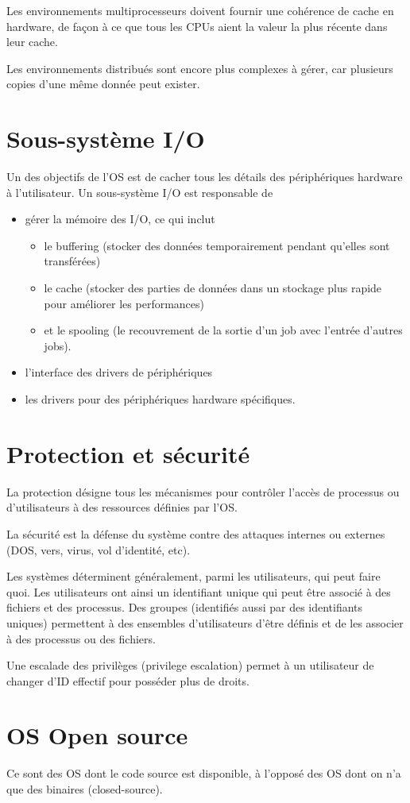 
Les environnements multiprocesseurs doivent fournir une cohérence de cache en hardware, de façon à ce que tous les CPUs aient la valeur la plus récente dans leur cache.

Les environnements distribués sont encore plus complexes à gérer, car plusieurs copies d'une même donnée peut exister.

\section{Sous-système I/O}

Un des objectifs de l'OS est de cacher tous les détails des périphériques hardware à l'utilisateur. Un sous-système I/O est responsable de

\begin{itemize}
	\item gérer la mémoire des I/O, ce qui inclut
	\begin{itemize}
		\item le buffering (stocker des données temporairement pendant qu'elles sont transférées)
	\item le cache (stocker des parties de données dans un stockage plus rapide pour améliorer les performances)
	\item et le spooling (le recouvrement de la sortie d'un job avec l'entrée d'autres jobs).
	\end{itemize}
	
	\item l'interface des drivers de périphériques
	\item les drivers pour des périphériques hardware spécifiques.
\end{itemize}

\section{Protection et sécurité}

La protection désigne tous les mécanismes pour contrôler l'accès de processus ou d'utilisateurs à des ressources définies par l'OS.

La sécurité est la défense du système contre des attaques internes ou externes (DOS, vers, virus, vol d'identité, etc).

Les systèmes déterminent généralement, parmi les utilisateurs, qui peut faire quoi. Les utilisateurs ont ainsi un identifiant unique qui peut être associé à des fichiers et des processus. Des groupes (identifiés aussi par des identifiants uniques) permettent à des ensembles d'utilisateurs d'être définis et de les associer à des processus ou des fichiers.

Une escalade des privilèges (privilege escalation) permet à un utilisateur de changer d'ID effectif pour posséder plus de droits.

\section{OS Open source}

Ce sont des OS dont le code source est disponible, à l'opposé des OS dont on n'a que des binaires (closed-source).